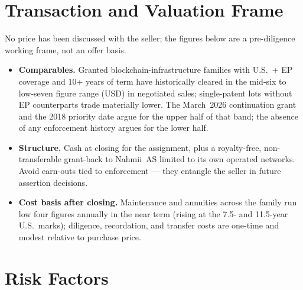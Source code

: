\documentclass[11pt,a4paper]{article}
\begin{document}
\section{Transaction and Valuation Frame}

No price has been discussed with the seller; the figures below are a
pre-diligence working frame, not an offer basis.

\begin{itemize}[leftmargin=1.4em]
  \item \textbf{Comparables.} Granted blockchain-infrastructure
  families with U.S.\ + EP coverage and 10+ years of term have
  historically cleared in the mid-six to low-seven figure range (USD)
  in negotiated sales; single-patent lots without EP counterparts trade
  materially lower. The March~2026 continuation grant and the 2018
  priority date argue for the upper half of that band; the absence of
  any enforcement history argues for the lower half.
  \item \textbf{Structure.} Cash at closing for the assignment, plus a
  royalty-free, non-transferable grant-back to Nahmii~AS limited to its
  own operated networks. Avoid earn-outs tied to enforcement --- they
  entangle the seller in future assertion decisions.
  \item \textbf{Cost basis after closing.} Maintenance and annuities
  across the family run low four figures annually in the near term
  (rising at the 7.5- and 11.5-year U.S.\ marks); diligence,
  recordation, and transfer costs are one-time and modest relative to
  purchase price.
\end{itemize}

\section{Risk Factors}
\end{document}
